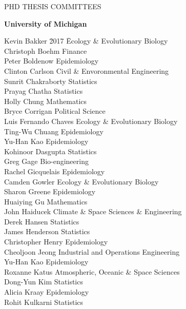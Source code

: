 \begin{mylist}{PHD THESIS COMMITTEES}

\item {\bf University of Michigan}
\begin{tabbing}
Kevin Bakker \hspace{2cm} \= 2017 \hspace{1cm} \= Ecology \& Evolutionary Biology\\
Christoph Boehm   \> Finance\\
Peter Boldenow  \> Epidemiology\\
Clinton Carlson  \> Civil \& Envoronmental Engineering\\
Sunrit Chakraborty  \> Statistics\\
Prayag Chatha  \> Statistics\\
Holly Chung  \> Mathematics\\
Bryce Corrigan  \> Political Science\\
Luis Fernando Chaves  \> Ecology \& Evolutionary Biology\\
Ting-Wu Chuang  \> Epidemiology\\
Yu-Han Kao  \> Epidemiology\\
Kohinoor Dasgupta  \> Statistics \\
Greg Gage  \> Bio-engineering\\ 
Rachel Gicquelais  \> Epidemiology\\
Camden Gowler  \> Ecology \& Evolutionary Biology\\
Sharon Greene  \> Epidemiology\\ 
Huaiying Gu  \> Mathematics\\
John Haiducek \> Climate \& Space Sciences \& Engineering\\
Derek Hansen \> Statistics\\
James Henderson  \> Statistics\\
Christopher Henry  \> Epidemiology\\
Cheoljoon Jeong  \> Industrial and Operations Engineering\\
Yu-Han Kao  \> Epidemiology\\
Roxanne Katus  \> Atmospheric, Oceanic \& Space Sciences\\
Dong-Yun Kim  \> Statistics\\
Alicia Kraay  \> Epidemiology\\
Rohit Kulkarni  \> Statistics\\

\end{tabbing}
\end{mylist}
